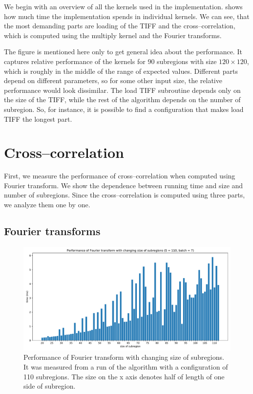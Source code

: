We begin with an overview of all the kernels used in the implementation.  shows how much time the implementation spends in individual kernels. We can see, that the most demanding parts are loading of the TIFF and the cross--correlation, which is computed using the multiply kernel and the Fourier transforms.

The figure is mentioned here only to get general idea about the performance. It captures relative performance of the kernels for 90 subregions with size $120 \times 120$, which is roughly in the middle of the range of expected values. Different parts depend on different parameters, so for some other input size, the relative performance would look dissimilar. The load TIFF subroutine depends only on the size of the TIFF, while the rest of the algorithm depends on the number of subregion. So, for instance, it is possible to find a configuration that makes load TIFF the longest part. 

\section{Cross--correlation}
First, we measure the performance of cross--correlation when computed using Fourier transform. We show the dependence between running time and size and number of subregions. Since the cross--correlation is computed using three parts, we analyze them one by one.


\subsection{Fourier transforms}
\label{FFT-eval}
\begin{figure}
	\centering
	\includegraphics[width=\textwidth]{img/eval/Fourier-transform-size}
	\caption{Performance of Fourier transform with changing size of subregions. It was measured from a run of the algorithm with a configuration of 110 subregions. The size on the x axis denotes half of length of one side of subregion.}
	\label{Fourier-transform-size}
\end{figure}

